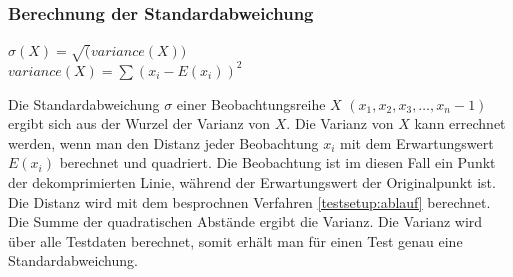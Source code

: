 \subsubsection{Berechnung der Standardabweichung}
\begin{center}
$\sigma(X) = \sqrt(variance(X))$\\
$variance(X) = \sum{(x_i - E(x_i))^2}$
\end{center}
Die Standardabweichung $\sigma$ einer Beobachtungsreihe $X$ $(x_1,x_2,x_3,\ldots, x_n-1)$ ergibt sich aus der Wurzel der Varianz von $X$. Die Varianz von $X$ kann errechnet werden, wenn man den Distanz jeder Beobachtung $x_i$ mit dem Erwartungswert $E(x_i)$ berechnet und quadriert. Die Beobachtung ist im diesen Fall ein Punkt der dekomprimierten Linie, während der Erwartungswert der Originalpunkt ist. Die Distanz wird mit dem besprochnen Verfahren \ref{testsetup:ablauf} berechnet. Die Summe der quadratischen Abstände ergibt die Varianz. Die Varianz wird über alle Testdaten berechnet, somit erhält man für einen Test genau eine Standardabweichung.